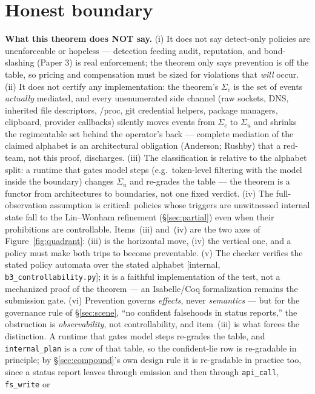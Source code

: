 \documentclass[11pt,a4paper]{article}  \usepackage{mdframed} \usepackage{graphicx}
\begin{document}
\section{Honest boundary}\label{sec:boundary} \begin{boundary} \textbf{What this theorem does NOT say.} (i) It does not say
detect-only policies are unenforceable or hopeless --- detection feeding audit, reputation, and bond-slashing (Paper 3) is
real enforcement; the theorem only says prevention is off the table, so pricing and compensation must be sized for violations
that \emph{will} occur. (ii) It does not certify any implementation: the theorem's $\Sigma_c$ is the set of events
\emph{actually} mediated, and every unenumerated side channel (raw sockets, DNS, inherited file descriptors, /proc, git
credential helpers, package managers, clipboard, provider callbacks) silently moves events from $\Sigma_c$ to $\Sigma_u$ and
shrinks the regimentable set behind the operator's back --- complete mediation of the claimed alphabet is an architectural
obligation (Anderson; Rushby) that a red-team, not this proof, discharges. (iii) The classification is relative to the
alphabet split: a runtime that gates model steps (e.g.\ token-level filtering with the model inside the boundary) changes
$\Sigma_u$ and re-grades the table --- the theorem is a functor from architectures to boundaries, not one fixed verdict. (iv)
The full-observation assumption is critical: policies whose triggers are unwitnessed internal state fall to the
Lin--Wonham refinement (\S\ref{sec:partial}) even when their prohibitions are controllable. Items~(iii) and~(iv) are the two
axes of Figure~\ref{fig:quadrant}: (iii) is the horizontal move, (iv) the vertical one, and a policy must make both trips to
become preventable. (v) The checker verifies the
stated policy automata over the stated alphabet [internal, \texttt{b3\_controllability.py}]; it is a faithful implementation
of the test, not a mechanized proof of the theorem --- an Isabelle/Coq formalization remains the submission gate. (vi)
Prevention governs \emph{effects}, never \emph{semantics} --- but for the governance rule of \S\ref{sec:scene}, ``no
confident falsehoods in status reports,'' the obstruction is \emph{observability}, not controllability, and item~(iii) is
what forces the distinction. A runtime that gates model steps re-grades the table, and \texttt{internal\_plan} is a row of
that table, so the confident-lie row is re-gradable in principle; by \S\ref{sec:compound}'s own design rule it is re-gradable
in practice too, since a status report leaves through emission and then through \texttt{api\_call}, \texttt{fs\_write} or

\end{boundary}
\end{document}
